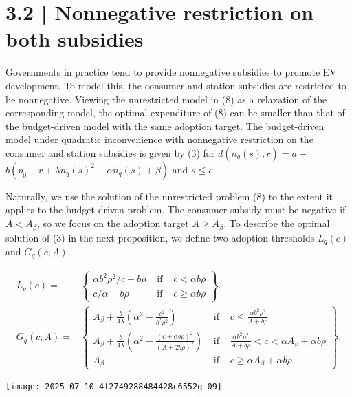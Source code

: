 \documentclass[10pt]{article}
\begin{document}
\section*{3.2 | Nonnegative restriction on both subsidies}
Governments in practice tend to provide nonnegative subsidies to promote EV development. To model this, the consumer and station subsidies are restricted to be nonnegative. Viewing the unrestricted model in (8) as a relaxation of the corresponding model, the optimal expenditure of (8) can be smaller than that of the budget-driven model with the same adoption target. The budget-driven model under quadratic inconvenience with nonnegative restriction on the consumer and station subsidies is given by (3) for $d\left(n_{q}(s), r\right)=a-$ $b\left(p_{0}-r+\lambda n_{q}(s)^{2}-\alpha n_{q}(s)+\beta\right)$ and $s \leq c$.

Naturally, we use the solution of the unrestricted problem (8) to the extent it applies to the budget-driven problem. The consumer subsidy must be negative if $A<A_{\beta}$, so we focus on the adoption target $A \geq A_{\beta}$. To describe the optimal solution of (3) in the next proposition, we define two adoption thresholds $L_{q}(c)$ and $G_{q}(c ; A)$.


\begin{align*}
L_{q}(c)= & \left\{\begin{array}{lll}
\alpha b^{2} \rho^{2} / c-b \rho & \text { if } & c<\alpha b \rho \\
c / \alpha-b \rho & \text { if } & c \geq \alpha b \rho
\end{array}\right\} . \\
G_{q}(c ; A)= & \left\{\begin{array}{lll}
A_{\beta}+\frac{b}{4 \lambda}\left(\alpha^{2}-\frac{c^{2}}{b^{2} \rho^{2}}\right) & \text { if } & c \leq \frac{\alpha b^{2} \rho^{2}}{A+b \rho} \\
A_{\beta}+\frac{b}{4 \lambda}\left(\alpha^{2}-\frac{(c+\alpha b \rho)^{2}}{(A+2 b \rho)^{2}}\right) & \text { if } & \frac{\alpha b^{2} \rho^{2}}{A+b \rho}<c<\alpha A_{\beta}+\alpha b \rho \\
A_{\beta} & \text { if } & c \geq \alpha A_{\beta}+\alpha b \rho
\end{array}\right\} . \tag{9}
\end{align*}


\begin{center}
\texttt{[image: 2025\_07\_10\_4f2749288484428c6552g-09]}
\end{center}
\end{document}
